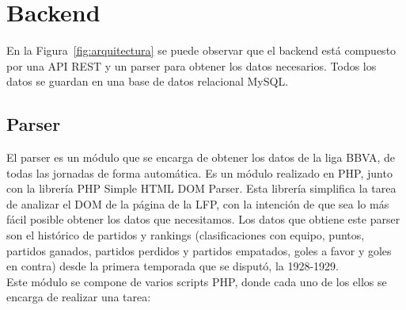 \section{Backend}

En la Figura~\ref{fig:arquitectura} se puede observar que el backend está compuesto por una API REST y un parser para obtener los datos necesarios. Todos los datos se guardan en una base de datos relacional MySQL. 

\subsection*{Parser}

El parser es un módulo que se encarga de obtener los datos de la liga BBVA, de todas las jornadas de forma automática. Es un módulo realizado en PHP, junto con la librería PHP Simple HTML DOM Parser. Esta librería simplifica la tarea de analizar el DOM de la página de la LFP, con la intención de que sea lo más fácil posible obtener los datos que necesitamos. Los datos que obtiene este parser son el histórico de partidos y rankings (clasificaciones con equipo, puntos, partidos ganados, partidos perdidos y partidos empatados, goles a favor y goles en contra) desde la primera temporada que se disputó, la 1928-1929.\\

Este módulo se compone de varios scripts PHP, donde cada uno de los ellos se encarga de realizar una tarea:

